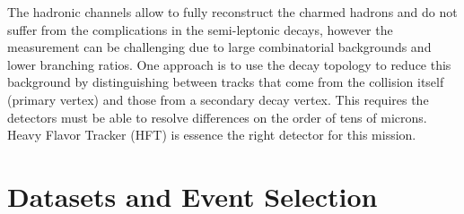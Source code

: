 \documentclass[a4paper]{article}
\begin{document}
The hadronic channels allow to fully reconstruct the charmed hadrons and do not suffer from the complications in the semi-leptonic decays, however the measurement can be challenging due to large combinatorial backgrounds and lower branching ratios. One approach is to use the decay topology to reduce this background by distinguishing between tracks that come from the collision itself (primary vertex) and those from a secondary decay vertex. This requires the detectors must be able to resolve differences on the order of tens of microns. Heavy Flavor Tracker (HFT) is essence the right detector for this mission.

\section{\label{dataset}Datasets and Event Selection}



\end{document}
